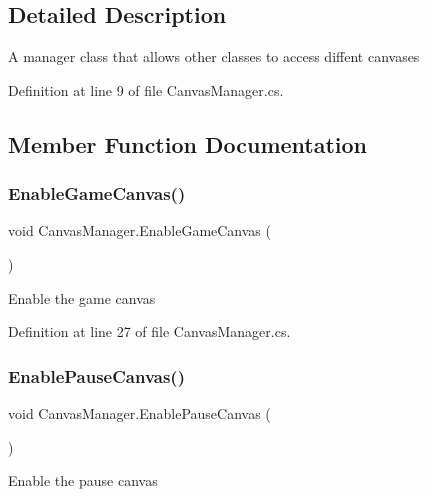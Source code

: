 \subsection{Detailed Description}
A manager class that allows other classes to access diffent canvases 



Definition at line 9 of file Canvas\+Manager.\+cs.



\subsection{Member Function Documentation}
\mbox{\label{class_canvas_manager_ae9d3e7181eaefcfe96a7c00772d85f69}} 
\subsubsection{\texorpdfstring{Enable\+Game\+Canvas()}{EnableGameCanvas()}}
{\footnotesize\ttfamily void Canvas\+Manager.\+Enable\+Game\+Canvas (\begin{DoxyParamCaption}{ }\end{DoxyParamCaption})}



Enable the game canvas 



Definition at line 27 of file Canvas\+Manager.\+cs.

\mbox{\label{class_canvas_manager_a4b45b461a40a6642cbb6ff47b6c13cf5}} 
\subsubsection{\texorpdfstring{Enable\+Pause\+Canvas()}{EnablePauseCanvas()}}
{\footnotesize\ttfamily void Canvas\+Manager.\+Enable\+Pause\+Canvas (\begin{DoxyParamCaption}{ }\end{DoxyParamCaption})}



Enable the pause canvas 



